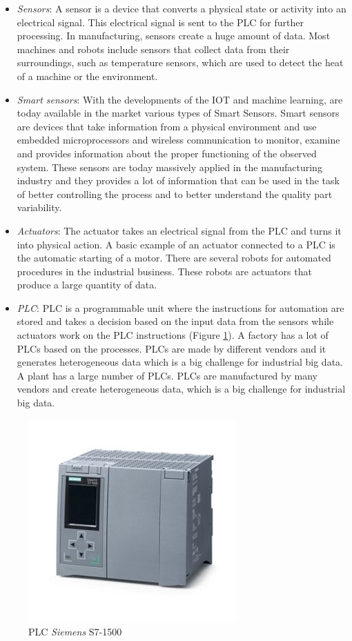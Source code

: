 \begin{itemize}
    \item \textit{Sensors}: A sensor is a device that converts a physical state or activity into an electrical signal. This electrical signal is sent to the PLC for further processing. In manufacturing, sensors create a huge amount of data. Most machines and robots include sensors that collect data from their surroundings, such as temperature sensors, which are used to detect the heat of a machine or the environment.
    \item \textit{Smart sensors}: With the developments of the IOT and machine learning, are today available in the market various types of Smart Sensors. Smart sensors are devices that take information from a physical environment and use embedded microprocessors and wireless communication to monitor, examine and provides information about the proper functioning of the observed system. These sensors are today massively applied in the manufacturing industry and they provides a lot of information that can be used in the task of better controlling the process and to better understand the quality part variability.
    \item \textit{Actuators}: The actuator takes an electrical signal from the PLC and turns it into physical action. A basic example of an actuator connected to a PLC is the automatic starting of a motor. There are several robots for automated procedures in the industrial business. These robots are actuators that produce a large quantity of data.
    \item \textit{PLC}: PLC is a programmable unit where the instructions for automation are stored and takes a decision based on the input data from the sensors while actuators work on the PLC instructions (Figure \ref{fig:plc}). A factory has a lot of PLCs based on the processes. PLCs are made by different vendors and it generates heterogeneous data which is a big challenge for industrial big data.
    A plant has a large number of PLCs. PLCs are manufactured by many vendors and create heterogeneous data, which is a big challenge for industrial big data.
\end{itemize}

\begin{figure}
\centerline{\includegraphics[scale=1]{images/chapter_3/PLC.jpg}}
\caption{PLC \textit{Siemens} S7-1500}
\label{fig:plc}
\end{figure}


